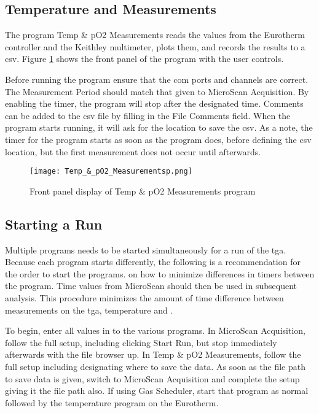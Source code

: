     \subsection{Temperature and  Measurements}
        The program Temp \& pO2 Measurements reads the values from the Eurotherm controller and the Keithley multimeter, plots them, and records the results to a \gls{csv}.
        Figure \ref{fig:temppo2measure} shows the front panel of the program with the user controls.

        Before running the program ensure that the com ports and channels are correct.
        The Measurement Period should match that given to MicroScan Acquisition.
        By enabling the timer, the program will stop after the designated time.
        Comments can be added to the \gls{csv} file by filling in the File Comments field.
        When the program starts running, it will ask for the location to save the \gls{csv}.
        As a note, the timer for the program starts as soon as the program does, before defining the \gls{csv} location, but the first measurement does not occur until afterwards.

        \begin{figure}
            \begin{center}
            \texttt{[image: Temp\_\&\_pO2\_Measurementsp.png]}
            \end{center}
            \caption{Front panel display of Temp \& pO2 Measurements program}
            \label{fig:temppo2measure}
        \end{figure}

    \subsection{Starting a Run}
        Multiple programs needs to be started simultaneously for a run of the \gls{tga}.
        Because each program starts differently, the following is a recommendation for the order to start the programs. on how to minimize differences in timers between the program.
        Time values from MicroScan should then be used in subsequent analysis.
        This procedure minimizes the amount of time difference between measurements on the \gls{tga}, temperature and .

        To begin, enter all values in to the various programs.
        In MicroScan Acquisition, follow the full setup, including clicking Start Run, but stop immediately afterwards with the file browser up.
        In Temp \& pO2 Measurements, follow the full setup including designating where to save the data.
        As soon as the file path to save data is given, switch to MicroScan Acquisition and complete the setup giving it the file path also.
        If using Gas Scheduler, start that program as normal followed by the temperature program on the Eurotherm.

